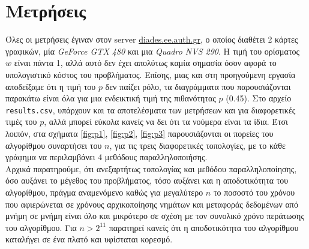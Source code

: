 \documentclass[11pt,a4paper,titlepage]{article}
\begin{document}
\section{Μετρήσεις}
	Όλες οι μετρήσεις έγιναν στον server \url{diades.ee.auth.gr}, ο οποίος διαθέτει 2 κάρτες γραφικών, μία \textit{GeForce GTX 480} και μια \textit{Quadro NVS 290}. Η τιμή του ορίσματος $w$ είναι πάντα 1, αλλά αυτό δεν έχει απολύτως καμία σημασία όσον αφορά το υπολογιστικό κόστος του προβλήματος. Επίσης, μιας και στη προηγούμενη εργασία αποδείξαμε ότι η τιμή του $p$ δεν παίζει ρόλο, τα διαγράμματα που παρουσιάζονται παρακάτω είναι όλα για μια ενδεικτική τιμή της πιθανότητας $p$ (0.45). Στο αρχείο \verb|results.csv|, υπάρχουν και τα αποτελέσματα των μετρήσεων και για διαφορετικές τιμές του $p$, αλλά μπορεί εύκολα κανείς να δει ότι τα νούμερα είναι τα ίδια. Έτσι λοιπόν, στα σχήματα \ref{fig:p1}, \ref{fig:p2}, \ref{fig:p3} παρουσιάζονται οι πορείες του αλγορίθμου συναρτήσει του $n$, για τις τρεις διαφορετικές τοπολογίες, με το κάθε γράφημα να περιλαμβάνει 4 μεθόδους παραλληλοποιήσης.\\

	Αρχικά παρατηρούμε, ότι ανεξαρτήτως τοπολογίας και μεθόδου παραλληλοποίησης, όσο αυξάνει το μέγεθος του προβλήματος, τόσο αυξάνει και η αποδοτικότητα του αλγορίθμου, πράγμα αναμενόμενο καθώς για μεγαλύτερο $n$ το ποσοστό του χρόνου που αφιερώνεται σε χρόνους αρχικοποίησης νημάτων και μεταφοράς δεδομένων από μνήμη σε μνήμη είναι όλο και μικρότερο σε σχέση με τον συνολικό χρόνο περάτωσης του αλγορίθμου. Για $n > 2^{11}$ παρατηρεί κανείς ότι η αποδοτικότητα του αλγορίθμου καταλήγει σε ένα πλατό και υφίσταται κορεσμό.\\
\end{document}
